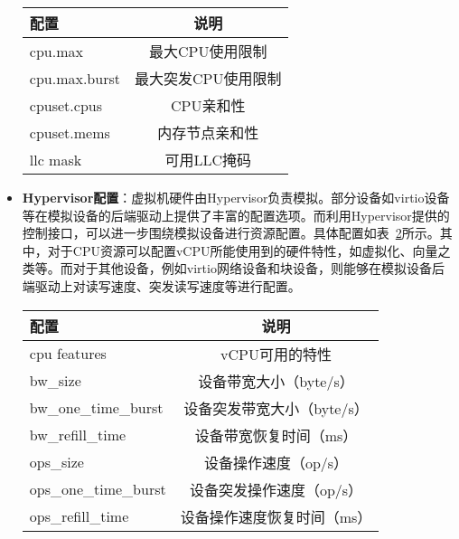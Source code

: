 \begin{itemize}
\begin{table}[H]
    \label{tab:cz_cgroup_config}
    \footnotesize%
    \setlength{\tabcolsep}{30pt}%
    \renewcommand{\arraystretch}{1.25}%
    \centering
    \begin{tabular}{lc}
        \hline
        配置 & 说明\\
        \hline
        cpu.max & 最大CPU使用限制 \\
        cpu.max.burst & 最大突发CPU使用限制 \\
        cpuset.cpus & CPU亲和性 \\
        cpuset.mems & 内存节点亲和性 \\
        llc mask& 可用LLC掩码 \\
        \hline
    \end{tabular}
\end{table}

    \item \textbf{Hypervisor配置}：虚拟机硬件由Hypervisor负责模拟。部分设备如virtio设备等在模拟设备的后端驱动上提供了丰富的配置选项。而利用Hypervisor提供的控制接口，可以进一步围绕模拟设备进行资源配置。具体配置如表~\ref{tab:cz_hv_config}所示。其中，对于CPU资源可以配置vCPU所能使用到的硬件特性，如虚拟化、向量之类等。而对于其他设备，例如virtio网络设备和块设备，则能够在模拟设备后端驱动上对读写速度、突发读写速度等进行配置。

\begin{table}[H]
    \label{tab:cz_hv_config}
    \footnotesize%
    \setlength{\tabcolsep}{30pt}%
    \renewcommand{\arraystretch}{1.25}%
    \centering
    \begin{tabular}{lc}
        \hline
        配置 & 说明\\
        \hline
        cpu features& vCPU可用的特性\\
        bw\_size & 设备带宽大小（byte/s）\\
        bw\_one\_time\_burst & 设备突发带宽大小（byte/s）\\
        bw\_refill\_time & 设备带宽恢复时间（ms）\\
        ops\_size & 设备操作速度（op/s）\\
        ops\_one\_time\_burst & 设备突发操作速度（op/s）\\
        ops\_refill\_time & 设备操作速度恢复时间（ms）\\
        \hline
    \end{tabular}
\end{table}

\end{itemize}

